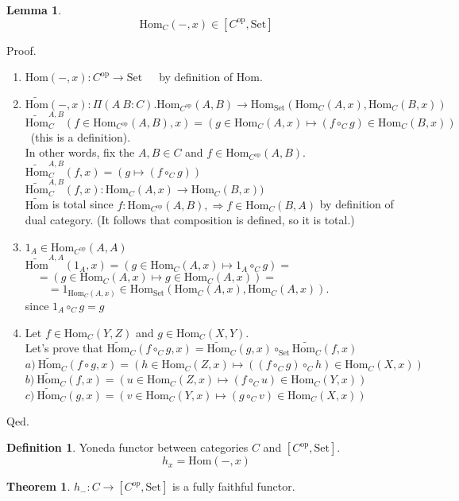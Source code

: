 \documentclass[10pt,a4paper]{article}
\theoremstyle{definition}
\newtheorem{definition}{Definition}[section]
\newtheorem{lemma}{Lemma}[section]
\newtheorem{theorem}{Theorem}[section]
\newcommand{\Hom}{{\mbox{Hom}}}
\newcommand{\HomMor}{{\widetilde{\Hom}\mbox{}}}
\newcommand{\op}{{\mbox{op}}}
\newcommand{\Set}{{\mbox{Set}}}
\newcommand{\ra}{{\rightarrow}}
\begin{document}
\begin{lemma}
$$\Hom_C(-, x) \in [C^\op,\Set]$$
\end{lemma}

\noindent Proof.
\begin{enumerate}
\item $\Hom(-, x) : C^\op \ra \Set$\ \ \ by definition of $\Hom$.
\item $\HomMor(-, x) :\Pi(A\ B:C).\Hom_{C^\op}(A,B) \ra \Hom_\Set(\Hom_C(A,x), \Hom_C(B,x))$\\
$\HomMor_C^{A,B}(f\in\Hom_{C^\op}(A,B), x) = (g \in\Hom_C(A,x) \mapsto (f \circ_C g) \in\Hom_C(B,x))$\ (this is a definition).\\
In other words, fix the $A,B\in C$ and $f\in\Hom_{C^\op}(A,B)$.\\
$\HomMor_C^{A,B}(f, x) = (g\mapsto (f \circ_C g))$\\
$\HomMor_C^{A,B}(f, x) : \Hom_C(A,x) \to \Hom_C(B,x))$
\\
$\HomMor$ is total since $f:\Hom_{C^\op}(A,B), \Rightarrow f\in\Hom_C(B,A)$ by definition of dual category. (It follows that composition is defined, so it is total.)
\item $1_A\in\Hom_{C^\op}(A,A)$\\
$\HomMor^{A,A}(1_A, x) = \left(g \in\Hom_C(A,x)\mapsto 1_A \circ_C g\right) = $\\
$\quad = \left(g \in\Hom_C(A,x) \mapsto g \in\Hom_C(A,x)\right) =$\\
$\quad \quad = 1_{\Hom_C(A,x)} \in \Hom_\Set\left(\Hom_C(A,x), \Hom_C(A,x)\right).$\\
since $1_A \circ_C g = g$\\
\item Let $f\in\Hom_C(Y,Z)$ and $g\in\Hom_C(X,Y)$.\\
Let's prove that $\widetilde{\Hom}\mbox{}_C(f\circ_C g, x) = \HomMor_C(g, x) \circ_\Set \widetilde{\Hom_C}(f, x)$\\
$a)\ \HomMor_C(f\circ g, x) = (h \in\Hom_C(Z,x) \mapsto ((f\circ_C g) \circ_C h)\in\Hom_C(X,x))$\\
$b)\ \HomMor_C(f, x) = \left(u \in\Hom_C(Z,x) \mapsto (f \circ_C u)\in\Hom_C(Y,x)\right)$\\
$c)\ \HomMor_C(g, x) = \left(v \in\Hom_C(Y,x) \mapsto (g \circ_C v)\in\Hom_C\left(X,x\right)\right)$\\
\end{enumerate}
Qed.
\begin{definition}
Yoneda functor between categories $C$ and $[C^\op,\Set]$.
$$h_x = \Hom(-, x)$$
\end{definition}
\begin{theorem}
$h_{-}:C\rightarrow [C^{op},\Set]$ is a fully faithful functor.
\end{theorem}
\end{document}
